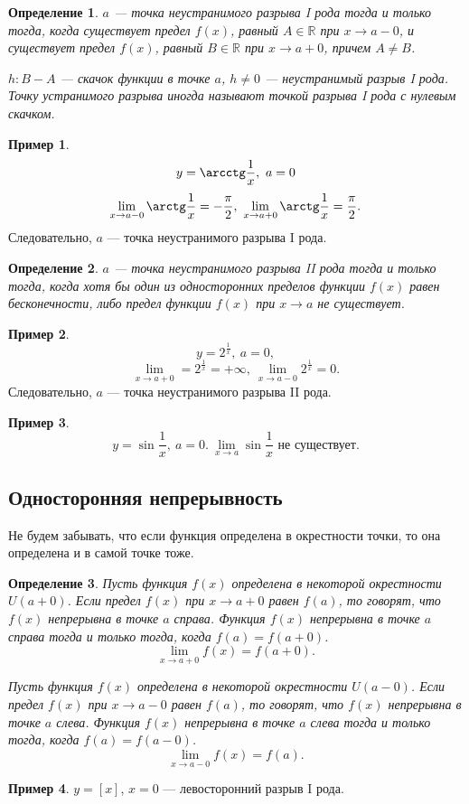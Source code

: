 \documentclass[a4paper,12pt]{article} %
\newtheorem{definition}{Определение}[section]
\theoremstyle{remark}
\theoremstyle{definition}
\newtheorem{exmp}{Пример}[section]
\begin{document}
\begin{definition}
	$a$ --- точка неустранимого разрыва I рода тогда и только тогда, когда существует предел $f(x)$, равный $A \in \mathbb{R}$ при $x\to a-0$, и существует предел $f(x)$, равный $B\in \mathbb{R}$ при $x\to a+0$, причем $A\neq B$.	

    $h : B-A$ --- скачок функции в точке $a$, $h\neq 0$ --- неустранимый разрыв I рода. Точку устранимого разрыва иногда называют точкой разрыва I рода с нулевым скачком.
\end{definition}
\begin{exmp}
    \[ y = \arcctg \frac{1}{x}, \ a = 0 \] 
    \[ \lim_{x \to a-0} \arctg \frac{1}{x} = - \frac{\pi}{2}, \ \lim_{x \to a+0} \arctg \frac{1}{x} = \frac{\pi}{2} .\] 
    Следовательно, $a$ --- точка неустранимого разрыва I рода.
\end{exmp}

\begin{definition}
    $a$ --- точка неустранимого разрыва II рода тогда и только тогда, когда хотя бы один из односторонних пределов функции $f(x)$ равен бесконечности, либо предел функции $f(x)$ при $x\to a$ не существует.
\end{definition}
\begin{exmp}
    \[ y = 2^{\frac{1}{x}}, \ a = 0,\] 
    \[\lim_{x \to a + 0} = 2^{\frac{1}{x}} = +\infty, \ \lim_{x \to a-0} 2^{\frac{1}{x}} = 0.\] 
    Следовательно, $a$ --- точка неустранимого разрыва II рода.
\end{exmp}
\begin{exmp}
    \[y = \sin \frac{1}{x}, \ a = 0. \ \lim_{x \to a} \sin \frac{1}{x} \text{ не существует}.\] 
\end{exmp}

\subsection{Односторонняя непрерывность}
Не будем забывать, что если функция определена в окрестности точки, то она определена и в самой точке тоже.
\begin{definition}
	Пусть функция $f(x)$ определена в некоторой окрестности $U(a+0)$. Если предел $f(x)$ при $x\to a+0$ равен $f(a)$, то говорят, что $f(x)$ непрерывна в точке $a$ справа. Функция $f(x)$ непрерывна в точке $a$ справа тогда и только тогда, когда $f(a) = f(a+0)$.
     \[\lim_{x \to a+0} f(x) = f(a + 0).\] 

	Пусть функция $f(x)$ определена в некоторой окрестности $U(a-0)$. Если предел $f(x)$ при $x\to a-0$ равен $f(a)$, то говорят, что $f(x)$ непрерывна в точке $a$ слева. Функция $f(x)$ непрерывна в точке $a$ слева тогда и только тогда, когда $f(a) = f(a-0)$.
    \[\lim_{x \to a-0} f(x) = f(a).\] 
\end{definition}
\begin{exmp}
    $y = [x]$, $x = 0$ --- левосторонний разрыв I рода.
\end{exmp}
\end{document}
